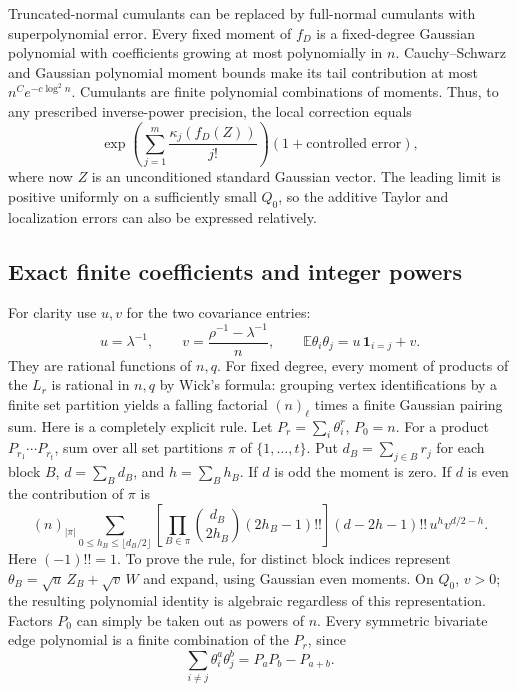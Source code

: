 \documentclass[11pt,a4paper]{article}
\numberwithin{equation}{section}
\theoremstyle{remark}
\newcommand{\E}{\mathbb E}
\newcommand{\1}{\mathbf 1}
\begin{document}
Truncated-normal cumulants can be replaced by full-normal cumulants with
superpolynomial error. Every fixed moment of $f_D$ is a fixed-degree
Gaussian polynomial with coefficients growing at most polynomially in
$n$. Cauchy--Schwarz and Gaussian polynomial moment bounds make its tail
contribution at most $n^C e^{-c\log^2 n}$. Cumulants are finite polynomial
combinations of moments. Thus, to any prescribed inverse-power precision,
the local correction equals
\begin{equation}\label{tfs:eq:localexpansion}
\exp\left(\sum_{j=1}^m\frac{\kappa_j(f_D(Z))}{j!}\right)
                    (1+\text{controlled error}),
\end{equation}
where now $Z$ is an unconditioned standard Gaussian vector. The leading
limit is positive uniformly on a sufficiently small $Q_0$, so the
additive Taylor and localization errors can also be expressed relatively.

\subsection{Exact finite coefficients and integer powers}
For clarity use $u,v$ for the two covariance entries:
\begin{equation}\label{tfs:eq:coventries}
u=\lambda^{-1},\qquad
v=\frac{\rho^{-1}-\lambda^{-1}}n,\qquad
\E\theta_i\theta_j=u\,\1_{i=j}+v.
\end{equation}
They are rational functions of $n,q$. For fixed degree, every moment
of products of the $L_r$ is rational in $n,q$ by Wick's formula: grouping
vertex identifications by a finite set partition yields a falling
factorial $(n)_\ell$ times a finite Gaussian pairing sum.
Here is a completely explicit rule. Let $P_r=\sum_i\theta_i^r$, $P_0=n$.
For a product $P_{r_1}\cdots P_{r_t}$, sum over all set partitions
$\pi$ of $\{1,\ldots,t\}$. Put $d_B=\sum_{j\in B}r_j$ for each block
$B$, $d=\sum_B d_B$, and $h=\sum_B h_B$. If $d$ is odd the moment is zero.
If $d$ is even the contribution of $\pi$ is
\begin{equation}\label{tfs:eq:wick}
(n)_{|\pi|}
\sum_{0\leq h_B\leq\lfloor d_B/2\rfloor}
\left[\prod_{B\in\pi}\binom{d_B}{2h_B}(2h_B-1)!!\right]
(d-2h-1)!!\,u^h v^{d/2-h}.
\end{equation}
Here $(-1)!!=1$. To prove the rule, for distinct block indices represent
$\theta_B=\sqrt u\,Z_B+\sqrt v\,W$ and expand, using Gaussian even moments.
On $Q_0$, $v>0$; the resulting polynomial identity is algebraic regardless
of this representation. Factors $P_0$ can simply be taken out as powers
of $n$. Every symmetric bivariate edge polynomial is a finite combination
of the $P_r$, since
\[
\sum_{i\ne j}\theta_i^a\theta_j^b=P_aP_b-P_{a+b}.
\]
\end{document}
